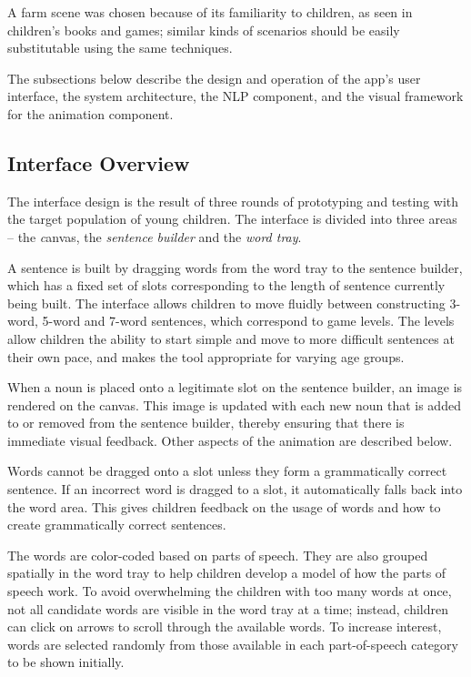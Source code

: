 \documentclass{sigchi-ext}
\begin{document}
A farm scene was chosen because of its familiarity to children, as seen in children’s books and games; similar kinds of scenarios should be easily substitutable using the same techniques.

The subsections below describe the design and operation of the app’s user interface, the system architecture, the NLP component, and the visual framework for the animation component.

\subsection{Interface Overview}
The interface design is the result of three rounds of prototyping and testing with the target population of young children. The interface is divided into three areas – the \emph canvas, the \emph {sentence builder} and the \emph {word tray}. 

A sentence is built by dragging words from the word tray to the sentence builder, which has a fixed set of slots corresponding to the length of sentence currently being built.  The interface allows children to move fluidly between constructing 3-word, 5-word and 7-word sentences, which correspond to game levels.  The levels allow children the ability to start simple and move to more difficult sentences at their own pace, and makes the tool appropriate for varying age groups.

When a noun is placed onto a legitimate slot on the sentence builder, an image is rendered on the canvas. This image is updated with each new noun that is added to or removed from the sentence builder, thereby ensuring that there is immediate visual feedback.  Other aspects of the animation are described below.

Words cannot be dragged onto a slot unless they form a grammatically correct sentence. If an incorrect word is dragged to a slot, it automatically falls back into the word area. This gives children   feedback on the usage of words and how to create grammatically correct sentences.

The words are color-coded based on parts of speech. They are also grouped spatially in the word tray to help children develop a model of how the parts of speech work.  To avoid overwhelming the children with too many words at once, not all candidate words are visible in the word tray at a time; instead, children can click on arrows to scroll through the available words.  To increase interest, words are selected randomly from those available in each part-of-speech category to be shown initially.
\end{document}
